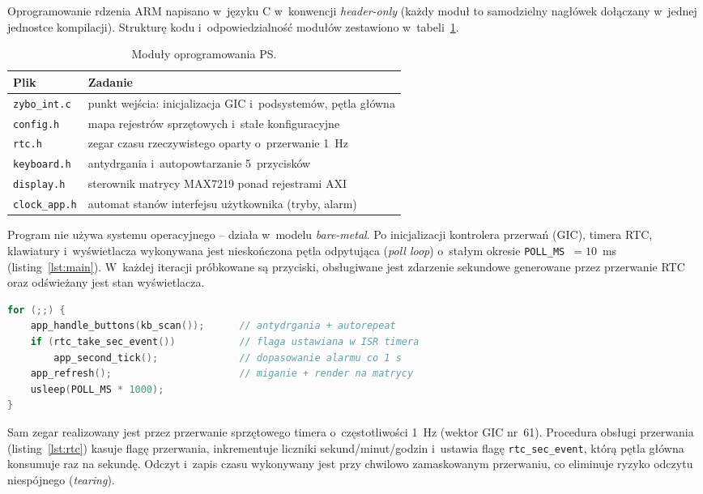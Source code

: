 \documentclass[12pt,a4paper]{article}
\begin{document}
Oprogramowanie rdzenia ARM napisano w~języku C w~konwencji \emph{header-only}
(każdy moduł to samodzielny nagłówek dołączany w~jednej jednostce kompilacji).
Strukturę kodu i~odpowiedzialność modułów zestawiono w~tabeli~\ref{tab:ps}.

\begin{table}[H]
\centering
\caption{Moduły oprogramowania PS.}
\label{tab:ps}
\small
\begin{tabularx}{\textwidth}{@{}l X@{}}
\toprule
\textbf{Plik} & \textbf{Zadanie} \\
\midrule
\texttt{zybo\_int.c} & punkt wejścia: inicjalizacja GIC i~podsystemów, pętla główna \\
\texttt{config.h}    & mapa rejestrów sprzętowych i~stałe konfiguracyjne \\
\texttt{rtc.h}       & zegar czasu rzeczywistego oparty o~przerwanie 1~Hz \\
\texttt{keyboard.h}  & antydrgania i~autopowtarzanie 5~przycisków \\
\texttt{display.h}   & sterownik matrycy MAX7219 ponad rejestrami AXI \\
\texttt{clock\_app.h}& automat stanów interfejsu użytkownika (tryby, alarm) \\
\bottomrule
\end{tabularx}
\end{table}

Program nie używa systemu operacyjnego -- działa w~modelu \emph{bare-metal}.
Po inicjalizacji kontrolera przerwań (GIC), timera RTC, klawiatury
i~wyświetlacza wykonywana jest nieskończona pętla odpytująca (\emph{poll
loop}) o~stałym okresie \texttt{POLL\_MS}~$=10$~ms (listing~\ref{lst:main}).
W~każdej iteracji próbkowane są przyciski, obsługiwane jest zdarzenie sekundowe
generowane przez przerwanie RTC oraz odświeżany jest stan wyświetlacza.

\begin{lstlisting}[language=C, caption={Pętla główna (\texttt{zybo\_int.c}).}, label={lst:main}]
for (;;) {
    app_handle_buttons(kb_scan());      // antydrgania + autorepeat
    if (rtc_take_sec_event())           // flaga ustawiana w ISR timera
        app_second_tick();              // dopasowanie alarmu co 1 s
    app_refresh();                      // miganie + render na matrycy
    usleep(POLL_MS * 1000);
}
\end{lstlisting}

Sam zegar realizowany jest przez przerwanie sprzętowego timera o~częstotliwości
1~Hz (wektor GIC nr~61). Procedura obsługi przerwania (listing~\ref{lst:rtc})
kasuje flagę przerwania, inkrementuje liczniki sekund/minut/godzin i~ustawia
flagę \texttt{rtc\_sec\_event}, którą pętla główna konsumuje raz na sekundę.
Odczyt i~zapis czasu wykonywany jest przy chwilowo zamaskowanym przerwaniu,
co eliminuje ryzyko odczytu niespójnego (\emph{tearing}).
\end{document}
